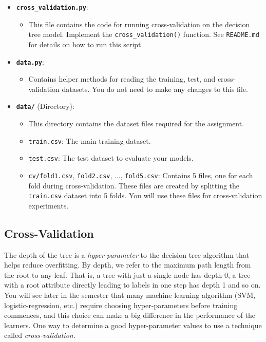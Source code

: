 \begin{itemize}
    \item \textbf{\texttt{cross\_validation.py}}:
    \begin{itemize}\itemsep0em
        \item This file contains the code for running cross-validation on the decision tree model. 
        Implement the \texttt{cross\_validation()} function. 
        See \texttt{README.md} for details on how to run this script.
    \end{itemize}
    
    \item \textbf{\texttt{data.py}}:
    \begin{itemize}\itemsep0em
        \item Contains helper methods for reading the training, test, and cross-validation datasets. 
        You do not need to make any changes to this file.
    \end{itemize}
    
    \item \textbf{\texttt{data/}} (Directory):
    \begin{itemize}\itemsep0em
        \item This directory contains the dataset files required for the assignment.
        \item \texttt{train.csv}: The main training dataset.
        \item \texttt{test.csv}: The test dataset to evaluate your models.
        \item \texttt{cv/fold1.csv}, \texttt{fold2.csv}, ..., \texttt{fold5.csv}: Contains 5 files, one for each fold during cross-validation. 
        These files are created by splitting the \texttt{train.csv} dataset into 5 folds. 
        You will use these files for cross-validation experiments.
    \end{itemize}
\end{itemize}


\subsection*{Cross-Validation}

The depth of the tree is a \emph{hyper-parameter} to the decision tree algorithm
that helps reduce overfitting. By depth, we refer to the maximum path length
from the root to any leaf. That is, a tree with just a single node has depth 0,
a tree with a root attribute directly leading to labels in one step has depth 1
and so on. You will see later in the semester that many machine learning
algorithm (SVM, logistic-regression, etc.) require choosing hyper-parameters
before training commences, and this choice can make a big difference in the
performance of the learners.  One way to determine a good hyper-parameter values
to use a technique called \emph{cross-validation}.

